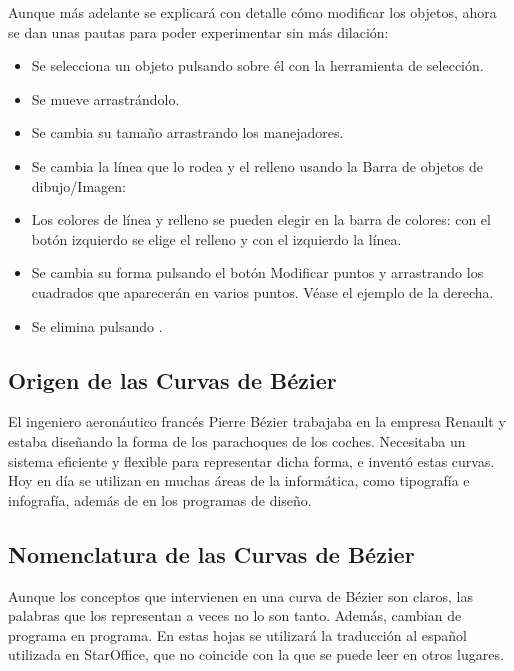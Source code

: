 Aunque más adelante se explicará con detalle cómo modificar los
objetos, ahora se dan unas pautas para poder experimentar sin más
dilación:

\begin{itemize}
\item Se selecciona un objeto pulsando sobre él con la herramienta 
de selección.

\item Se mueve arrastrándolo.

\item Se cambia su tamaño arrastrando los manejadores.

\item Se cambia la línea que lo rodea y el relleno usando la 
Barra de objetos de dibujo/Imagen:

\item Los colores de línea y relleno se pueden elegir en la barra 
de colores: con el botón izquierdo se elige el relleno y con el 
izquierdo la línea.

\item Se cambia su forma pulsando el botón Modificar puntos y 
arrastrando los cuadrados que aparecerán en varios puntos. Véase el 
ejemplo de la derecha.

\item Se elimina pulsando .
\end{itemize}

\subsection{Origen de las Curvas de Bézier}

El ingeniero aeronáutico francés Pierre Bézier trabajaba en la empresa
Renault y estaba diseñando la forma de los parachoques de los
coches. Necesitaba un sistema eficiente y flexible para representar
dicha forma, e inventó estas curvas. Hoy en día se utilizan en muchas
áreas de la informática, como tipografía e infografía, además de en
los programas de diseño.

\subsection{Nomenclatura de las Curvas de Bézier}

Aunque los conceptos que intervienen en una curva de Bézier son
claros, las palabras que los representan a veces no lo son
tanto. Además, cambian de programa en programa. En estas hojas se
utilizará la traducción al español utilizada en StarOffice, que no
coincide con la que se puede leer en otros lugares.

